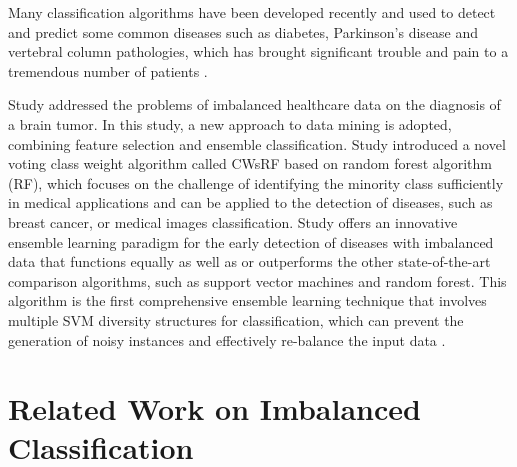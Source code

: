 Many classification algorithms have been developed recently and used to detect and predict some common diseases such as diabetes, Parkinson's disease and vertebral column pathologies, which has brought significant trouble and pain to a tremendous number of patients \cite{6}.

Study \cite{5} addressed the problems of imbalanced healthcare data on the diagnosis of a brain tumor. In this study, a new approach to data mining is adopted, combining feature selection and ensemble classification. Study \cite{3} introduced a novel voting class weight algorithm called CWsRF based on random forest algorithm (RF), which focuses on the challenge of identifying the minority class sufficiently in medical applications and can be applied to the detection of diseases, such as breast cancer, or medical images classification. Study \cite{8} offers an innovative ensemble learning paradigm for the early detection of diseases with imbalanced data that functions equally as well as or outperforms the other state-of-the-art comparison algorithms, such as support vector machines and random forest. This algorithm is the first comprehensive ensemble learning technique that involves multiple SVM diversity structures for classification, which can prevent the generation of noisy instances and effectively re-balance the input data \cite{8}. 

\section{Related Work on Imbalanced Classification}
